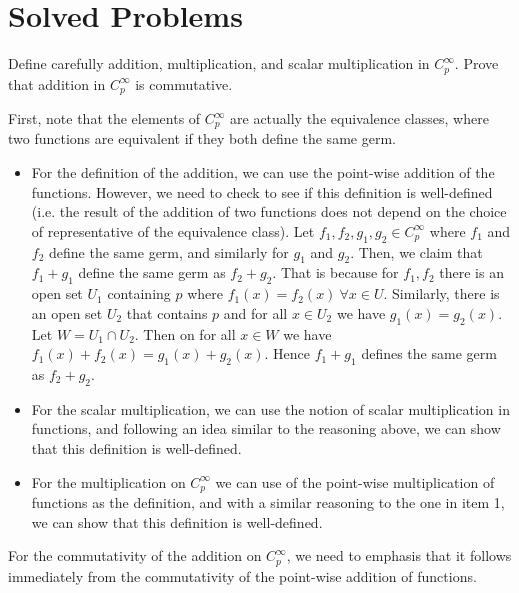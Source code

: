 \section{Solved Problems}
\begin{problem}
	Define carefully addition, multiplication, and scalar multiplication in $ C_p^\infty $. Prove that addition in $ C_p^\infty $ is commutative.
\end{problem}
\begin{solution}
	First, note that the elements of $ C_p^\infty $ are actually the equivalence classes, where two functions are equivalent if they both define the same germ.
	\begin{itemize}
		\item For the definition of the addition, we can use the point-wise addition of the functions. However, we need to check to see if this definition is well-defined (i.e. the result of the addition of two functions does not depend on the choice of representative of the equivalence class). Let $ f_1, f_2, g_1, g_2 \in C_p^\infty$ where $ f_1 $ and $ f_2 $ define the same germ, and similarly for $ g_1 $ and $ g_2 $. Then, we claim that $ f_1+g_1 $ define the same germ as $ f_2 + g_2 $. That is because for $ f_1, f_2 $ there is an open set $ U_1 $ containing $ p $ where $ f_1(x) = f_2(x) \ \forall x \in U $. Similarly, there is an open set $ U_2 $ that contains $ p $ and for all $ x \in U_2 $ we have $ g_1(x) = g_2(x) $. Let $ W = U_1 \cap U_2 $. Then on for all $ x \in W $ we have $ f_1(x) + f_2(x) = g_1(x) + g_2(x) $. Hence $ f_1+g_1 $ defines the same germ as $ f_2 + g_2 $.
		\item For the scalar multiplication, we can use the notion of scalar multiplication in functions, and following an idea similar to the reasoning above, we can show that this definition is well-defined.
		\item For the multiplication on $ C_p^\infty $ we can use of the point-wise multiplication of functions as the definition, and with a similar reasoning to the one in item 1, we can show that this definition is well-defined.
	\end{itemize}
	For the commutativity of the addition on $ C_p^\infty $, we need to emphasis that it follows immediately from the commutativity of the point-wise addition of functions.
\end{solution}


